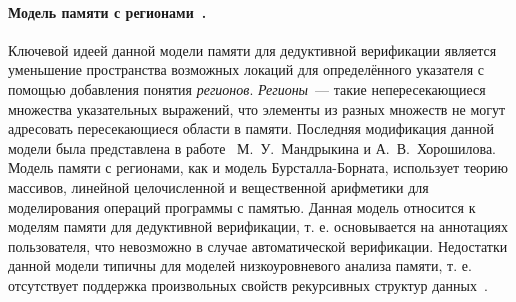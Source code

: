 \paragraph{Модель памяти с регионами~\cite{hubert2007separation}.} Ключевой идеей данной модели памяти для дедуктивной верификации является уменьшение пространства возможных локаций для определённого указателя с помощью добавления понятия \emph{регионов}. \emph{Регионы}~--- такие непересекающиеся множества указательных выражений, что элементы из разных множеств не могут адресовать пересекающиеся области в памяти. Последняя модификация данной модели была представлена в работе~\cite{mandrykin2017memory} М.~У.~Мандрыкина и А.~В.~Хорошилова. Модель памяти с регионами, как и модель Бурсталла-Борната, использует теорию массивов, линейной целочисленной и вещественной арифметики для моделирования операций программы с памятью. Данная модель относится к моделям памяти для дедуктивной верификации, т. е. основывается на аннотациях пользователя, что невозможно в случае автоматической верификации. Недостатки данной модели типичны для моделей низкоуровневого анализа памяти, т. е. отсутствует поддержка произвольных свойств рекурсивных структур данных~\cite{mandrik}.
